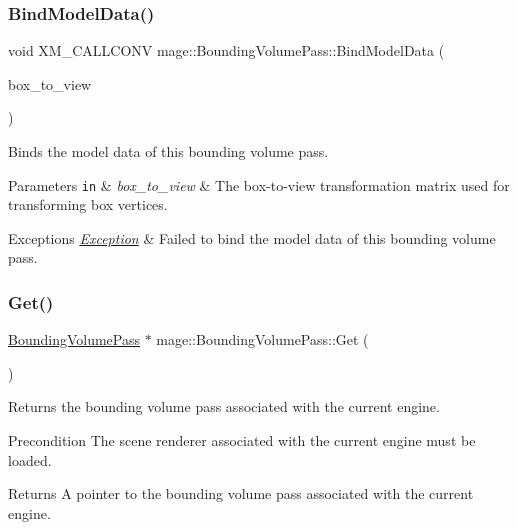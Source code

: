 \subsubsection{\texorpdfstring{Bind\+Model\+Data()}{BindModelData()}}
{\footnotesize\ttfamily void X\+M\+\_\+\+C\+A\+L\+L\+C\+O\+NV mage\+::\+Bounding\+Volume\+Pass\+::\+Bind\+Model\+Data (\begin{DoxyParamCaption}\item[{F\+X\+M\+M\+A\+T\+R\+IX}]{box\+\_\+to\+\_\+view }\end{DoxyParamCaption})\hspace{0.3cm}{\ttfamily [private]}}

Binds the model data of this bounding volume pass.


\begin{DoxyParams}[1]{Parameters}
\mbox{\tt in}  & {\em box\+\_\+to\+\_\+view} & The box-\/to-\/view transformation matrix used for transforming box vertices. \\
\hline
\end{DoxyParams}

\begin{DoxyExceptions}{Exceptions}
{\em \hyperlink{classmage_1_1_exception}{Exception}} & Failed to bind the model data of this bounding volume pass. \\
\hline
\end{DoxyExceptions}
\hypertarget{classmage_1_1_bounding_volume_pass_a254c44c1c9f18967c9d6cdb6e53d3bcd}{}\label{classmage_1_1_bounding_volume_pass_a254c44c1c9f18967c9d6cdb6e53d3bcd} 
\subsubsection{\texorpdfstring{Get()}{Get()}}
{\footnotesize\ttfamily \hyperlink{classmage_1_1_bounding_volume_pass}{Bounding\+Volume\+Pass} $\ast$ mage\+::\+Bounding\+Volume\+Pass\+::\+Get (\begin{DoxyParamCaption}{ }\end{DoxyParamCaption})\hspace{0.3cm}{\ttfamily [static]}}

Returns the bounding volume pass associated with the current engine.

\begin{DoxyPrecond}{Precondition}
The scene renderer associated with the current engine must be loaded. 
\end{DoxyPrecond}
\begin{DoxyReturn}{Returns}
A pointer to the bounding volume pass associated with the current engine. 
\end{DoxyReturn}
\hypertarget{classmage_1_1_bounding_volume_pass_a2115e9af06e0bc7e42fc95e10f0dacad}{}\label{classmage_1_1_bounding_volume_pass_a2115e9af06e0bc7e42fc95e10f0dacad} 
